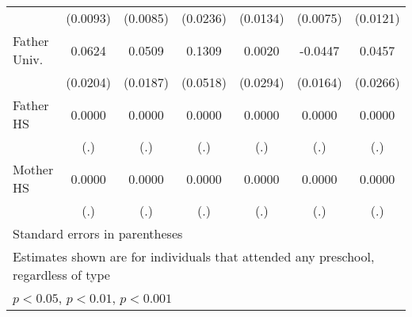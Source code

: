 \begin{table}[htbp]
\begin{tabular}{l*{6}{c}}
            &    (0.0093)         &    (0.0085)         &    (0.0236)         &    (0.0134)         &    (0.0075)         &    (0.0121)         \\
\addlinespace
Father Univ.&      0.0624\sym{**} &      0.0509\sym{**} &      0.1309\sym{*}  &      0.0020         &     -0.0447\sym{**} &      0.0457         \\
            &    (0.0204)         &    (0.0187)         &    (0.0518)         &    (0.0294)         &    (0.0164)         &    (0.0266)         \\
\addlinespace
Father HS   &      0.0000         &      0.0000         &      0.0000         &      0.0000         &      0.0000         &      0.0000         \\
            &         (.)         &         (.)         &         (.)         &         (.)         &         (.)         &         (.)         \\
\addlinespace
Mother HS   &      0.0000         &      0.0000         &      0.0000         &      0.0000         &      0.0000         &      0.0000         \\
            &         (.)         &         (.)         &         (.)         &         (.)         &         (.)         &         (.)         \\
\bottomrule
\multicolumn{7}{l}{\footnotesize Standard errors in parentheses}\\
\multicolumn{7}{l}{\footnotesize Estimates shown are for individuals that attended any preschool, regardless of type}\\
\multicolumn{7}{l}{\footnotesize \sym{*} \(p<0.05\), \sym{**} \(p<0.01\), \sym{***} \(p<0.001\)}\\
\end{tabular}
\end{table}
